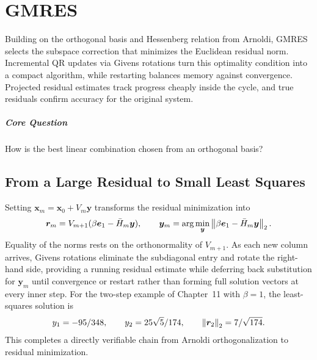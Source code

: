 \chapter{GMRES}\label{v0ch:12}
\begin{chaptersummary}
Building on the orthogonal basis and Hessenberg relation from Arnoldi, GMRES selects the subspace correction that minimizes the Euclidean residual norm. Incremental QR updates via Givens rotations turn this optimality condition into a compact algorithm, while restarting balances memory against convergence. Projected residual estimates track progress cheaply inside the cycle, and true residuals confirm accuracy for the original system.
\end{chaptersummary}
\paragraph{Core Question}How is the best linear combination chosen from an orthogonal basis?

\section{From a Large Residual to Small Least Squares}
Setting $\bm x_m=\bm x_0+V_m\bm y$ transforms the residual minimization into
\[
 \bm r_m=V_{m+1}(\beta\bm e_1-\bar H_m\bm y),\qquad
 \bm y_m=\arg\min_{\bm y}\left\lVert \beta\bm e_1-\bar H_m\bm y\right\rVert_2.
\]
Equality of the norms rests on the orthonormality of $V_{m+1}$. As each new column arrives, Givens rotations eliminate the subdiagonal entry and rotate the right-hand side, providing a running residual estimate while deferring back substitution for $\bm y_m$ until convergence or restart rather than forming full solution vectors at every inner step.
For the two-step example of Chapter~11 with $\beta=1$, the least-squares solution is
\[
 y_1=-95/348,\qquad y_2=25\sqrt5/174,\qquad
 \left\lVert \bm r_2\right\rVert_2=7/\sqrt{174}.
\]
This completes a directly verifiable chain from Arnoldi orthogonalization to residual minimization.
